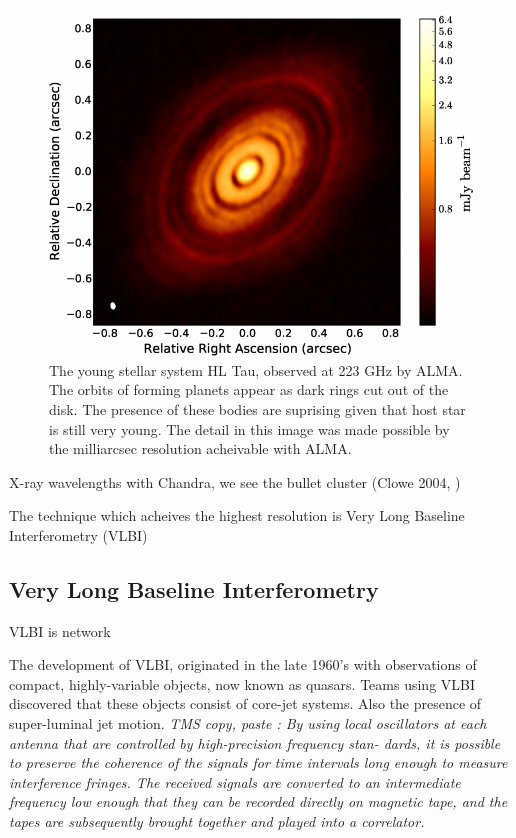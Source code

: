 \begin{figure}
\begin{center}

\includegraphics[width=\columnwidth]{Images/hl_tau}
\caption{The young stellar system HL Tau, observed at 223 GHz by ALMA. The orbits of forming planets appear as dark rings cut out of the disk. The presence of these bodies are suprising given that host star is still very young. The detail in this image was made possible by the milliarcsec resolution acheivable with ALMA. \label{fig:hl_tau}}

\end{center}
\end{figure}

X-ray wavelengths with Chandra, we see the bullet cluster (Clowe 2004, )

The technique which acheives the highest resolution is Very Long Baseline Interferometry (VLBI)

\subsection{Very Long Baseline Interferometry}

VLBI is  network 

The development of VLBI, originated in the late 1960's with observations of compact, highly-variable objects, now known as quasars. Teams using VLBI discovered that these objects consist of core-jet systems. Also the presence of super-luminal jet motion. \textit{TMS copy, paste : By using local
oscillators at each antenna that are controlled by high-precision frequency stan-
dards, it is possible to preserve the coherence of the signals for time intervals
long enough to measure interference fringes. The received signals are converted
to an intermediate frequency low enough that they can be recorded directly on
magnetic tape, and the tapes are subsequently brought together and played into
a correlator.}

